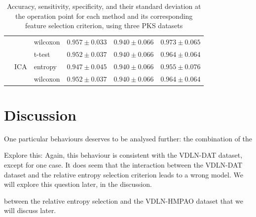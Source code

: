 \begin{table}
\begin{tabularx}{\linewidth}{Xllccc}
		&  & wilcoxon & $ 0.957 \pm 0.033 $ & $ 0.940 \pm 0.066 $ & $ 0.973 \pm 0.065 $ \\
		\cline{2-6}
		& \multirow{3}{*}{\ac{ICA}} & t-test & $ 0.952 \pm 0.037 $ & $ 0.940 \pm 0.066 $ & $ 0.964 \pm 0.064 $ \\
		&  & entropy & $ 0.947 \pm 0.045 $ & $ 0.940 \pm 0.066 $ & $ 0.955 \pm 0.076 $ \\
		&  & wilcoxon & $ 0.952 \pm 0.037 $ & $ 0.940 \pm 0.066 $ & $ 0.964 \pm 0.064 $ \\
		\bottomrule
		\end{tabularx}
		\caption[Performance values for the Parkinson's datasets]{Accuracy, sensitivity, specificity, and their standard deviation at the operation point for each method and its corresponding feature selection criterion, using three \protect\ac{PKS} datasets }
		\label{tab:featurePKS}
\end{table}

\section{Discussion}



One particular behaviours deserves to be analysed further: the combination of the 

Explore this: Again, this behaviour is consistent with the VDLN-DAT dataset, except for one case. It does seem that the interaction between the VDLN-DAT dataset and the relative entropy selection criterion leads to a wrong model. We will explore this question later, in the discussion. 


between the relative entropy selection and the VDLN-HMPAO dataset that we will discuss later. 